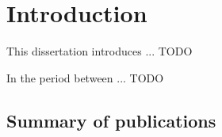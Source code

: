 \chapter{Introduction}

This dissertation introduces ... TODO \cite{fogelson2024herds}

In the period between ... TODO 









\newpage
\section{Summary of publications}
\newcommand{\fcite}[1]{
  \begin{leftbar}
  \begin{quote}%
    \citep{#1} \fullcite{#1}
  \end{quote}
  \end{leftbar}}










